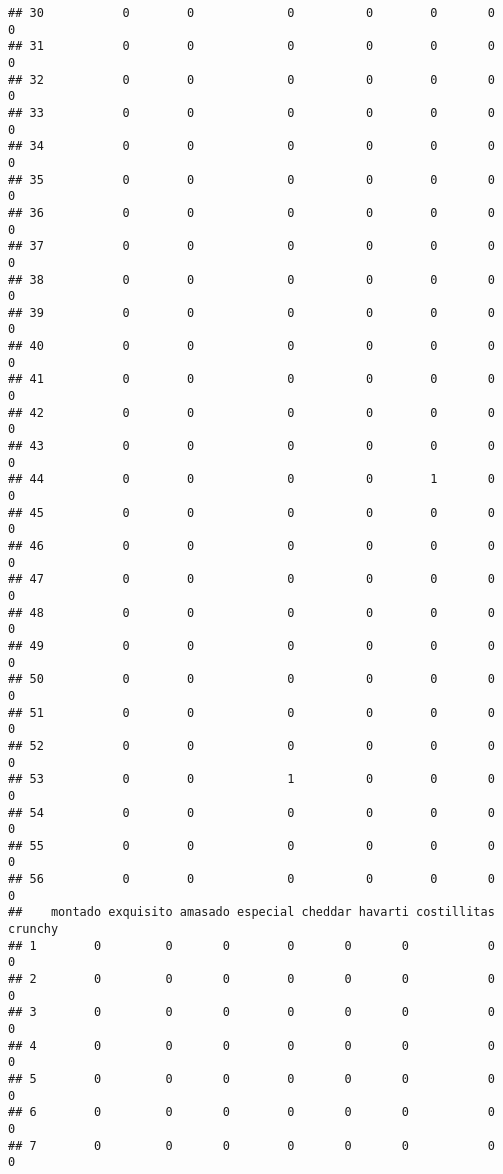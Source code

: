 \documentclass[
]{article}
\begin{document}
\begin{verbatim}
## 30           0        0             0          0        0       0      0
## 31           0        0             0          0        0       0      0
## 32           0        0             0          0        0       0      0
## 33           0        0             0          0        0       0      0
## 34           0        0             0          0        0       0      0
## 35           0        0             0          0        0       0      0
## 36           0        0             0          0        0       0      0
## 37           0        0             0          0        0       0      0
## 38           0        0             0          0        0       0      0
## 39           0        0             0          0        0       0      0
## 40           0        0             0          0        0       0      0
## 41           0        0             0          0        0       0      0
## 42           0        0             0          0        0       0      0
## 43           0        0             0          0        0       0      0
## 44           0        0             0          0        1       0      0
## 45           0        0             0          0        0       0      0
## 46           0        0             0          0        0       0      0
## 47           0        0             0          0        0       0      0
## 48           0        0             0          0        0       0      0
## 49           0        0             0          0        0       0      0
## 50           0        0             0          0        0       0      0
## 51           0        0             0          0        0       0      0
## 52           0        0             0          0        0       0      0
## 53           0        0             1          0        0       0      0
## 54           0        0             0          0        0       0      0
## 55           0        0             0          0        0       0      0
## 56           0        0             0          0        0       0      0
##    montado exquisito amasado especial cheddar havarti costillitas crunchy
## 1        0         0       0        0       0       0           0       0
## 2        0         0       0        0       0       0           0       0
## 3        0         0       0        0       0       0           0       0
## 4        0         0       0        0       0       0           0       0
## 5        0         0       0        0       0       0           0       0
## 6        0         0       0        0       0       0           0       0
## 7        0         0       0        0       0       0           0       0

\end{verbatim}
\end{document}
